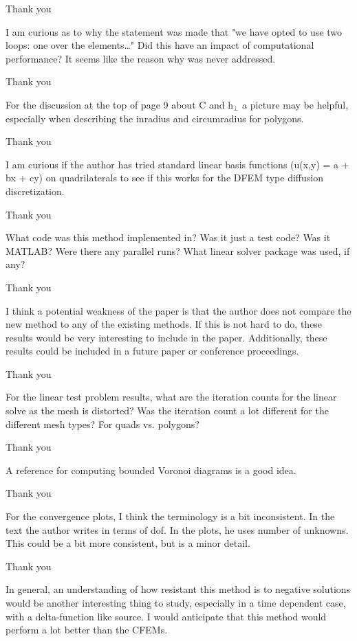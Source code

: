 \documentclass{article}
\begin{document}
Thank you
\bigskip

{
\color{blue}
I am curious as to why the statement was made that "we have opted to use two loops: one over the
elements…" Did this have an impact of computational performance? It seems like the reason why was never
addressed.
}


Thank you
\bigskip

{
\color{blue}
For the discussion at the top of page 9 about C and h$_\perp$ a picture may be helpful, especially when
describing the inradius and circumradius for polygons.
}


Thank you
\bigskip


{
\color{blue}
I am curious if the author has tried standard linear basis functions (u(x,y) = a + bx + cy) on
quadrilaterals to see if this works for the DFEM type diffusion discretization.
}


Thank you
\bigskip

{
\color{blue}
What code was this method implemented in? Was it just a test code? Was it MATLAB? Were there any
parallel runs? What linear solver package was used, if any?
}


Thank you
\bigskip


{
\color{blue}
I think a potential weakness of the paper is that the author does not compare the new method to any of
the existing methods. If this is not hard to do, these results would be very interesting to include in the
paper. Additionally, these results could be included in a future paper or conference proceedings.
}


Thank you
\bigskip


{
\color{blue}
For the linear test problem results, what are the iteration counts for the linear solve as the mesh is
distorted? Was the iteration count a lot different for the different mesh types? For quads vs. polygons?
}


Thank you
\bigskip


{
\color{blue}
A reference for computing bounded Voronoi diagrams is a good idea.
}


Thank you
\bigskip


{
\color{blue}
For the convergence plots, I think the terminology is a bit inconsistent. In the text the author writes
in terms of dof. In the plots, he uses number of unknowns. This could be a bit more consistent, but is a
minor detail.
}


Thank you
\bigskip


{
\color{blue}
In general, an understanding of how resistant this method is to negative solutions would be another
interesting thing to study, especially in a time dependent case, with a delta-function like source. I would
anticipate that this method would perform a lot better than the CFEMs.
}
\end{document}
